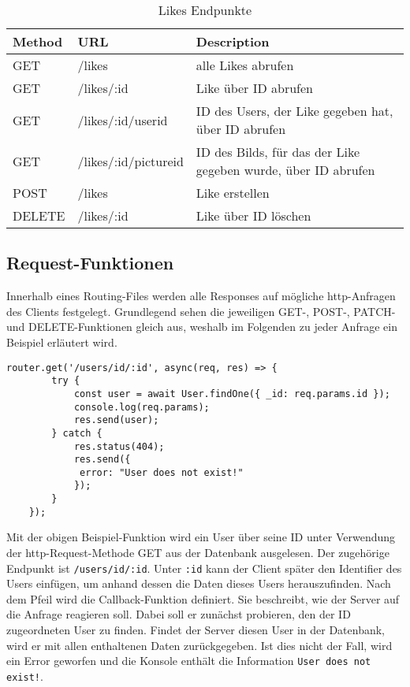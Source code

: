 \begin{table}[!htb]
    \begin{tabularx}{\textwidth}{|X|X|X|}
        \hline
        \textbf{Method} & \textbf{URL} & \textbf{Description} \\
        \hline
        \hline

    GET & /likes & alle Likes abrufen\\
    \hline
    GET & /likes/:id & Like über ID abrufen\\
    \hline
    GET & /likes/:id/userid & ID des Users, der Like gegeben hat, über ID abrufen\\
    \hline
    GET & /likes/:id/pictureid & ID des Bilds, für das der Like gegeben wurde, über ID abrufen\\
    \hline
    POST & /likes & Like erstellen\\
    \hline
    DELETE & /likes/:id & Like über ID löschen\\
    \hline

\end{tabularx}
\caption{Likes Endpunkte}
\label{likes endpunkte}
\end{table}

\clearpage
\subsection{Request-Funktionen}
Innerhalb eines Routing-Files werden alle Responses auf mögliche http-Anfragen des Clients festgelegt. Grundlegend sehen die jeweiligen GET-, POST-, PATCH- und DELETE-Funktionen gleich aus, weshalb im Folgenden zu jeder Anfrage ein Beispiel erläutert wird.

\begin{lstlisting}[caption=GET-Request, label=lst:getrequest, float=!htb]
    router.get('/users/id/:id', async(req, res) => {
        try {
            const user = await User.findOne({ _id: req.params.id });
            console.log(req.params);
            res.send(user);
        } catch {
            res.status(404);
            res.send({
             error: "User does not exist!"
            });
        }
    });
\end{lstlisting}

Mit der obigen Beispiel-Funktion wird ein User über seine ID unter Verwendung der http-Request-Methode GET aus der Datenbank ausgelesen. Der zugehörige Endpunkt ist \texttt{/users/id/:id}. Unter \texttt{:id} kann der Client später den Identifier des Users einfügen, um anhand dessen die Daten dieses Users herauszufinden. Nach dem Pfeil wird die Callback-Funktion definiert. Sie beschreibt, wie der Server auf die Anfrage reagieren soll. Dabei soll er zunächst probieren, den der ID zugeordneten User zu finden. Findet der Server diesen User in der Datenbank, wird er mit allen enthaltenen Daten zurückgegeben. Ist dies nicht der Fall, wird ein Error geworfen und die Konsole enthält die Information \texttt{User does not exist!}.

